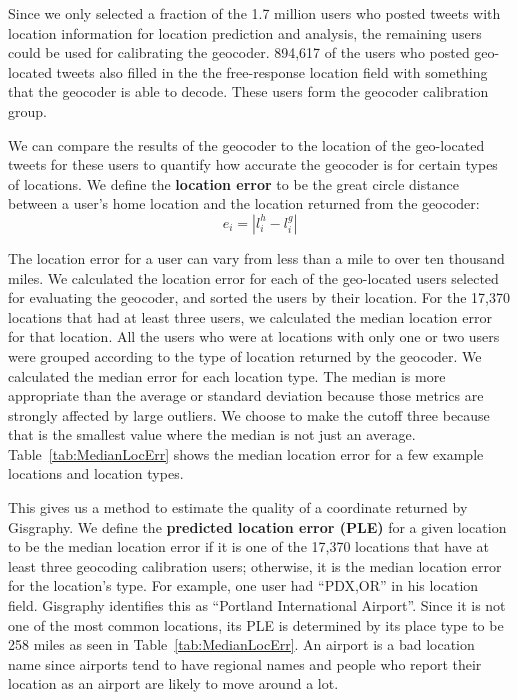Since we only selected a fraction of the 1.7 million users who posted tweets with
location information for location prediction and analysis, the remaining users
could be used for calibrating the geocoder.
%
894,617 of the users who posted geo-located tweets also filled in the
the free-response location field with something that the geocoder is able to
decode.
%
These users form the geocoder calibration group.

We can compare the results of the geocoder to the location of the geo-located
tweets for these users to quantify how accurate the geocoder is for certain
types of locations.
%
We define the \textbf{location error} to be the great circle distance between a
user's home location and the location returned from the geocoder:
\[
e_i = |l^h_i - l^g_i|
\]

The location error for a user can vary from less than a mile to over ten
thousand miles.
%
We calculated the location error for each of the geo-located users selected for
evaluating the geocoder, and sorted the users by their location.
%
For the 17,370 locations that had at least three users, we calculated the median
location error for that location.
%
All the users who were at locations with only one or two users were grouped
according to the type of location returned by the geocoder.
%
We calculated the median error for each location type.
%
The median is more appropriate than the average or standard deviation because
those metrics are strongly affected by large outliers.
%
We choose to make the cutoff three because that is the smallest value where the
median is not just an average.
Table~\ref{tab:MedianLocErr} shows the median location error for a few example
locations and location types.

This gives us a method to estimate the quality of a coordinate returned by
Gisgraphy.
%
We define the \textbf{predicted location error (PLE)} for a given location to
be the median location error if it is one of the 17,370 locations that have
at least three geocoding calibration users; otherwise, it is the median
location error for the location's type.
%
For example, one user had ``PDX,OR'' in his location field.
%
Gisgraphy identifies this as ``Portland International Airport''.
%
Since it is not one of the most common locations, its PLE is determined by its
place type to be 258 miles as seen in Table~\ref{tab:MedianLocErr}.
%
An airport is a bad location name since airports tend to have regional names
and people who report their location as an airport are likely to move around a
lot.

